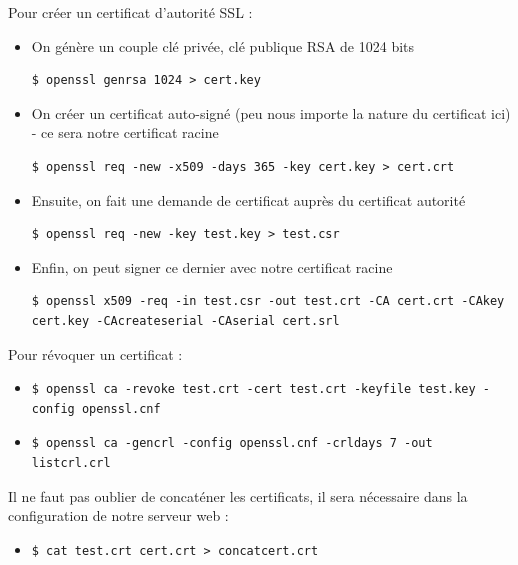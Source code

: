 Pour créer un certificat d'autorité SSL :
\begin{itemize}
\item On génère un couple clé privée, clé publique RSA de 1024 bits
\begin{verbatim}
$ openssl genrsa 1024 > cert.key
\end{verbatim}

\item On créer un certificat auto-signé (peu nous importe la nature du certificat ici) - ce sera notre certificat racine
\begin{verbatim}
$ openssl req -new -x509 -days 365 -key cert.key > cert.crt
\end{verbatim}

\item Ensuite, on fait une demande de certificat auprès du certificat autorité
\begin{verbatim}
$ openssl req -new -key test.key > test.csr
\end{verbatim}

\item Enfin, on peut signer ce dernier avec notre certificat racine
\begin{verbatim}
$ openssl x509 -req -in test.csr -out test.crt -CA cert.crt -CAkey cert.key -CAcreateserial -CAserial cert.srl
\end{verbatim}

\end{itemize}

Pour révoquer un certificat :
\begin{itemize}

\item 
\begin{verbatim}
$ openssl ca -revoke test.crt -cert test.crt -keyfile test.key -config openssl.cnf
\end{verbatim}

\item 
\begin{verbatim}
$ openssl ca -gencrl -config openssl.cnf -crldays 7 -out listcrl.crl
\end{verbatim}

\end{itemize}

Il ne faut pas oublier de concaténer les certificats, il sera nécessaire dans la configuration de notre serveur web :
\begin{itemize}
\item 
\begin{verbatim}
$ cat test.crt cert.crt > concatcert.crt
\end{verbatim}
\end{itemize}

